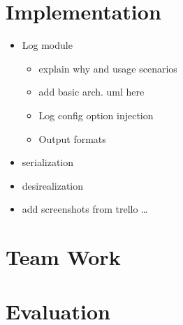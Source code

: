 \section{Implementation} 
\begin{itemize}
    \item Log module
    \begin{itemize}
        \item explain why and usage scenarios
        \item add basic arch. uml here
        \item Log config option injection
        \item Output formats
    \end{itemize}
\end{itemize}


\begin{itemize}
  \item serialization
  \item desirealization
  \item add screenshots from trello \ldots
\end{itemize}

\section{Team Work}

\section{Evaluation}

